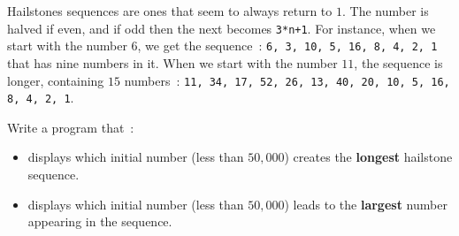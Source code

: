 
Hailstones sequences are ones that seem to
always return to $1$. The number is halved if even, and if
odd then the next becomes \verb^3*n+1^. For instance, when we start
with the number $6$, we get the sequence~:
\verb^6, 3, 10, 5, 16, 8, 4, 2, 1^
that has nine numbers in it. When we start with
the number $11$, the sequence is longer, containing $15$
numbers~:
\verb^11, 34, 17, 52, 26, 13, 40, 20, 10, 5, 16, 8, 4, 2, 1^.

\begin{exercise}
Write a program that~:
\begin{itemize}
\item displays which initial number (less than
$50,000$) creates the {\bf longest} hailstone sequence.
\item displays which initial number (less than
$50,000$) leads to the {\bf largest} number appearing in the sequence.
\end{itemize}
\end{exercise}
